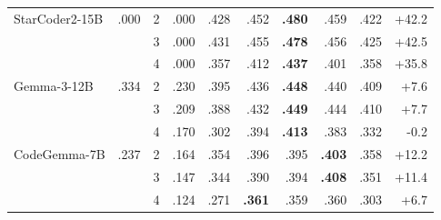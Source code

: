 \begin{table}[!t]
\begin{tabular}{@{}lrrrrrrrrr@{}}
\addlinespace[2pt]

StarCoder2-15B
& .000
& 2
& .000
& \textcolor{green!55!black}{.428}
& \textcolor{green!55!black}{.452}
& \textbf{\textcolor{green!55!black}{.480}}
& \textcolor{green!55!black}{.459}
& \textcolor{green!55!black}{.422}
& \textcolor{green!55!black}{+42.2} \\
&
& 3
& .000
& \textcolor{green!55!black}{.431}
& \textcolor{green!55!black}{.455}
& \textbf{\textcolor{green!55!black}{.478}}
& \textcolor{green!55!black}{.456}
& \textcolor{green!55!black}{.425}
& \textcolor{green!55!black}{+42.5} \\
&
& 4
& .000
& \textcolor{green!55!black}{.357}
& \textcolor{green!55!black}{.412}
& \textbf{\textcolor{green!55!black}{.437}}
& \textcolor{green!55!black}{.401}
& \textcolor{green!55!black}{.358}
& \textcolor{green!55!black}{+35.8} \\

\addlinespace[2pt]

Gemma-3-12B
& .334
& 2
& .230
& \textcolor{green!55!black}{.395}
& \textcolor{green!55!black}{.436}
& \textbf{\textcolor{green!55!black}{.448}}
& \textcolor{green!55!black}{.440}
& \textcolor{green!55!black}{.409}
& \textcolor{green!55!black}{+7.6} \\
&
& 3
& .209
& \textcolor{green!55!black}{.388}
& \textcolor{green!55!black}{.432}
& \textbf{\textcolor{green!55!black}{.449}}
& \textcolor{green!55!black}{.444}
& \textcolor{green!55!black}{.410}
& \textcolor{green!55!black}{+7.7} \\
&
& 4
& .170
& \textcolor{green!55!black}{.302}
& \textcolor{green!55!black}{.394}
& \textbf{\textcolor{green!55!black}{.413}}
& \textcolor{green!55!black}{.383}
& \textcolor{green!55!black}{.332}
& \textcolor{red!70!black}{-0.2} \\

\addlinespace[2pt]

CodeGemma-7B
& .237
& 2
& .164
& \textcolor{green!55!black}{.354}
& \textcolor{green!55!black}{.396}
& \textcolor{green!55!black}{.395}
& \textbf{\textcolor{green!55!black}{.403}}
& \textcolor{green!55!black}{.358}
& \textcolor{green!55!black}{+12.2} \\
&
& 3
& .147
& \textcolor{green!55!black}{.344}
& \textcolor{green!55!black}{.390}
& \textcolor{green!55!black}{.394}
& \textbf{\textcolor{green!55!black}{.408}}
& \textcolor{green!55!black}{.351}
& \textcolor{green!55!black}{+11.4} \\
&
& 4
& .124
& \textcolor{green!55!black}{.271}
& \textbf{\textcolor{green!55!black}{.361}}
& \textcolor{green!55!black}{.359}
& \textcolor{green!55!black}{.360}
& \textcolor{green!55!black}{.303}
& \textcolor{green!55!black}{+6.7} \\


\end{tabular}
\end{table}
